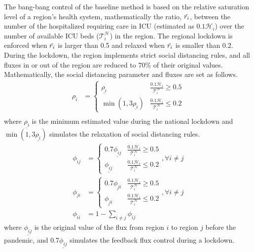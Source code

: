 \documentclass[conf]{new-aiaa}
\begin{document}
The bang-bang control of the baseline method is based on the relative saturation level of a region's health system, mathematically the ratio, $\Tilde{r_i}$, between the number of the hospitalized requiring care in ICU (estimated as $0.1\mathcal{H}_i$) over the number of available ICU beds ($\mathcal{T}_i^\mathcal{H}$) in the region. The regional lockdown is enforced when $\Tilde{r_i}$ is larger than 0.5 and relaxed when $\Tilde{r_i}$ is smaller than 0.2. During the lockdown, the region implements strict social distancing rules, and all fluxes in or out of the region are reduced to 70\% of their original values. Mathematically, the social distancing parameter and fluxes are set as follows.
\begin{equation}
    \begin{aligned}
        \rho_i &= \begin{cases}
                    \underline{\rho_i}   & \frac{0.1\mathcal{H}_i}{\mathcal{T}_i^\mathcal{H}} \ge 0.5  \\
                    \min(1, 3\underline{\rho_i})  & \frac{0.1\mathcal{H}_i}{\mathcal{T}_i^\mathcal{H}} \le 0.2
                  \end{cases} \\
    \end{aligned}
\end{equation}
where $\underline{\rho_i}$ is the minimum estimated value during the national lockdown and $\min(1, 3\underline{\rho_i})$ simulates the relaxation of social distancing rules.
\begin{equation}
    \begin{aligned}
       \phi_{ij} &= \begin{cases}
                    0.7\underline{\phi_{ij}}   & \frac{0.1\mathcal{H}_i}{\mathcal{T}_i^\mathcal{H}} \ge 0.5  \\
                    \underline{\phi_{ij}}  & \frac{0.1\mathcal{H}_i}{\mathcal{T}_i^\mathcal{H}} \le 0.2
                  \end{cases} , \forall i \ne j\\
        \phi_{ji} &= \begin{cases}
                    0.7\underline{\phi_{ji}}   & \frac{0.1\mathcal{H}_i}{\mathcal{T}_i^\mathcal{H}} \ge 0.5  \\
                    \underline{\phi_{ji}}  & \frac{0.1\mathcal{H}_i}{\mathcal{T}_i^\mathcal{H}} \le 0.2
                  \end{cases} , \forall i \ne j\\
        \phi_{ii} &= 1-\sum_{i\ne j}\phi_{ij}
    \end{aligned}
\end{equation}
where $\underline{\phi_{ij}}$ is the original value of the flux from region $i$ to region $j$ before the pandemic, and $0.7\underline{\phi_{ij}}$ simulates the feedback flux control during a lockdown. 
\end{document}
